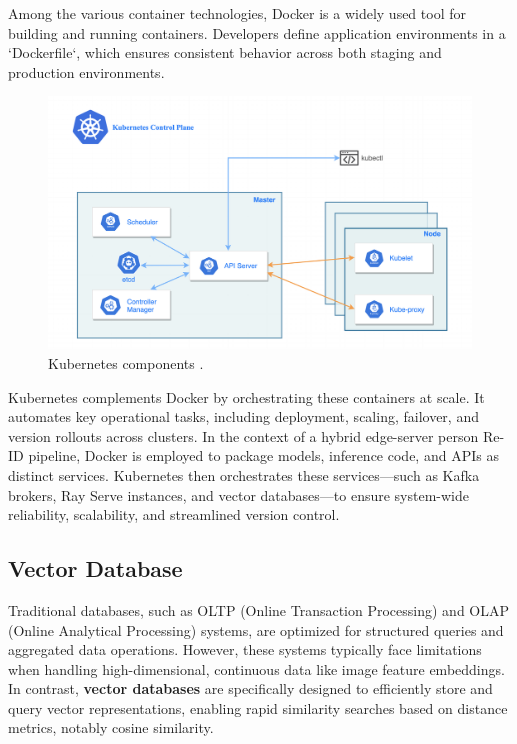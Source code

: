 \documentclass[../main.tex]{subfiles}
\begin{document}
Among the various container technologies, Docker \cite{docker_intro} is a widely used tool for building and running containers. Developers define application environments in a `Dockerfile`, which ensures consistent behavior across both staging and production environments. 

\begin{figure}[htbp]
    \centering
    \includegraphics[width=1\textwidth]{Figure/kubernetes.png}
    \caption{Kubernetes components \cite{kubernetes_architecture}.}
    \label{fig:kubernetes_architecture}
\end{figure}

Kubernetes complements Docker by orchestrating these containers at scale. It automates key operational tasks, including deployment, scaling, failover, and version rollouts across clusters. In the context of a hybrid edge-server person Re-ID pipeline, Docker is employed to package models, inference code, and APIs as distinct services. Kubernetes then orchestrates these services—such as Kafka brokers, Ray Serve instances, and vector databases—to ensure system-wide reliability, scalability, and streamlined version control.

\subsection{Vector Database}
\label{sec:vector_database}

Traditional databases, such as OLTP (Online Transaction Processing) and OLAP (Online Analytical Processing) systems, are optimized for structured queries and aggregated data operations. However, these systems typically face limitations when handling high-dimensional, continuous data like image feature embeddings. In contrast, \textbf{vector databases} are specifically designed to efficiently store and query vector representations, enabling rapid similarity searches based on distance metrics, notably cosine similarity.
\end{document}
